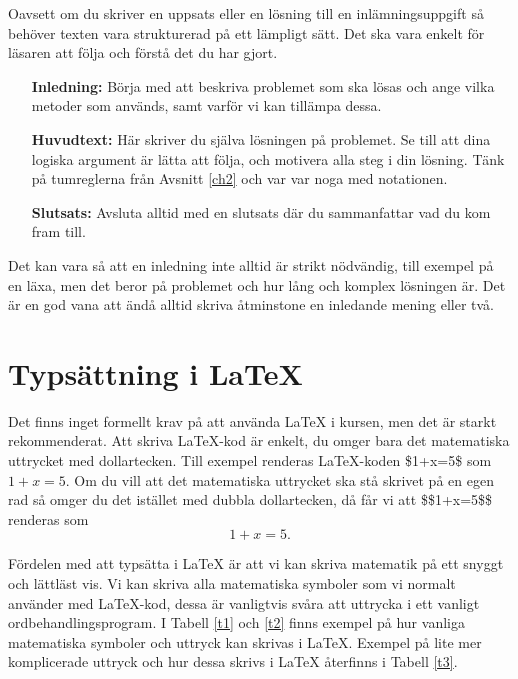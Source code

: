 \documentclass[titlepage]{article}
\begin{document}
Oavsett om du skriver en uppsats eller en lösning till en inlämningsuppgift så behöver texten vara strukturerad på ett lämpligt sätt. Det ska vara enkelt för läsaren att följa och förstå det du har gjort. 

\begin{itemize}[leftmargin=25mm, rightmargin=0mm]
    \item[\textbf{Inledning:}] Börja med att beskriva problemet som ska lösas och ange vilka metoder som används, samt varför vi kan tillämpa dessa.
    \item[\textbf{Huvudtext:}] Här skriver du själva lösningen på problemet. Se till att dina logiska argument är lätta att följa, och motivera alla steg i din lösning. Tänk på tumreglerna från Avsnitt \ref{ch2} och var var noga med notationen.
    \item[\textbf{Slutsats:}] Avsluta alltid med en slutsats där du sammanfattar vad du kom fram till.
\end{itemize}

Det kan vara så att en inledning inte alltid är strikt nödvändig, till exempel på en läxa, men det beror på problemet och hur lång och komplex lösningen är. Det är en god vana att ändå alltid skriva åtminstone en inledande mening eller två.




\section{Typsättning i \LaTeX}

Det finns inget formellt krav på att använda \LaTeX$ $ i kursen, men det är starkt rekommenderat. Att skriva \LaTeX-kod är enkelt, du omger bara det matematiska uttrycket med dollartecken. Till exempel renderas \LaTeX-koden \$1+x=5\$ som $1+x=5$. Om du vill att det matematiska uttrycket ska stå skrivet på en egen rad så omger du det istället med dubbla dollartecken, då får vi att \$\$1+x=5\$\$ renderas som $$1+x=5.$$

Fördelen med att typsätta i \LaTeX$ $ är att vi kan skriva matematik på ett snyggt och lättläst vis. Vi kan skriva alla matematiska symboler som vi normalt använder med \LaTeX-kod, dessa är vanligtvis svåra att uttrycka i ett vanligt ordbehandlingsprogram. I Tabell \ref{t1} och \ref{t2} finns exempel på hur vanliga matematiska symboler och uttryck kan skrivas i \LaTeX. Exempel på lite mer komplicerade uttryck och hur dessa skrivs i \LaTeX$ $ återfinns i Tabell \ref{t3}.
\end{document}
